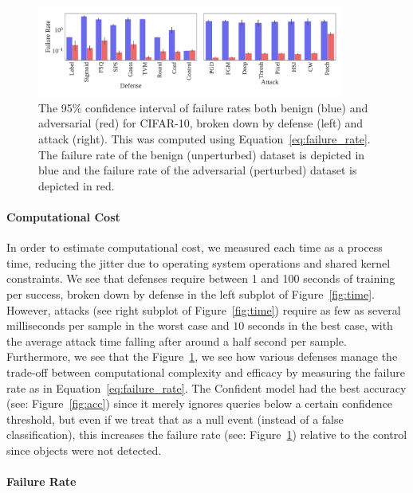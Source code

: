 \documentclass[journal]{IEEEtran}
\begin{document}
\begin{figure}[!hptb]
    {\centering
    \includegraphics[width=0.9\textwidth]{Fig14.pdf}
    \vspace{-1em}
    \caption{The 95\% confidence interval of failure rates both benign (blue) and adversarial (red) for CIFAR-10, broken down by defense (left) and attack (right). This was computed using Equation~\ref{eq:failure_rate}. The failure rate of the benign (unperturbed) dataset is depicted in blue and the failure rate of the adversarial (perturbed) dataset is depicted in red.}
    \label{fig:failure_rate}
    } %
\end{figure}

\paragraph{Computational Cost}

 In order to estimate computational cost, we measured each time as a process time, reducing the jitter due to operating system operations and shared kernel constraints. We see that defenses require between 1 and 100 seconds of training per success, broken down by defense in the left subplot of Figure~\ref{fig:time}. However, attacks (see right subplot of Figure~\ref{fig:time}) require as few as several milliseconds per sample in the worst case and $10$ seconds in the best case, with the average attack time falling after around a half second per sample. Furthermore, we see that the  Figure~\ref{fig:failure_rate}, we see how various defenses manage the trade-off between computational complexity and efficacy by measuring the failure rate as in Equation~\ref{eq:failure_rate}. The Confident model had the best accuracy (see: Figure~\ref{fig:acc}) since it merely ignores queries below a certain confidence threshold, but even if we treat that as a null event (instead of a false classification), this increases the failure rate (see: Figure~\ref{fig:failure_rate}) relative to the control since objects were not detected.
 

\paragraph{Failure Rate}
\end{document}
